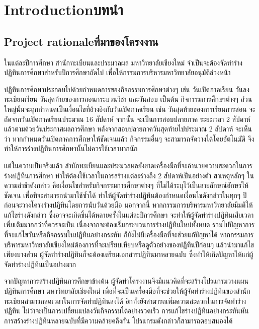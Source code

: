 \chapter{\ifenglish Introduction\else บทนำ\fi}

\section{\ifenglish Project rationale\else ที่มาของโครงงาน\fi}
ในแต่ละปีการศึกษา สำนักทะเบียนและประมวลผล มหาวิทยาลัยเชียงใหม่ จำเป็นจะต้องจัดทำร่างปฏิทินการศึกษาสำหรับปีการศึกษาถัดไป เพื่อให้กรรมการบริหารมหาวิทยาลัยอนุมัติล่วงหน้า

ปฏิทินการศึกษาประกอบไปด้วยกำหนดการของกิจกรรมการศึกษาต่างๆ เช่น วันเปิดภาคเรียน วันลงทะเบียนเรียน วันสุดท้ายของการถอนกระบวนวิชา และวันสอบ เป็นต้น
%
กิจกรรมการศึกษาต่างๆ ส่วนใหญ่นั้นจะถูกกำหนดเป็นเงื่อนไขที่อ้างอิงกับวันเปิดภาคเรียน เช่น วันสุดท้ายของการเรียนการสอน จะถัดจากวันเปิดภาคเรียนประมาณ 16 สัปดาห์ จากนั้น จะเป็นการสอบปลายภาค ระยะเวลา 2 สัปดาห์ แล้วตามด้วยวันประกาศผลการศึกษา หลังจากสอบปลายภาควันสุดท้ายไปประมาณ 2 สัปดาห์
%
จะเห็นว่า หากกำหนดวันเปิดภาคการศึกษาให้ชัดเจนแล้ว กิจกรรมอื่นๆ จะสามารถจัดวางได้โดยอัตโนมัติ จึงทำให้การร่างปฏิทินการศึกษานั้นไม่ควรใช้เวลามากนัก

แต่ในความเป็นจริงแล้ว สำนักทะเบียนและประมวลผลยังขาดเครื่องมือที่จะอำนวยความสะดวกในการร่างปฏิทินการศึกษา ทำให้ต้องใช้เวลาในการสร้างแต่ละร่างถึง 2 สัปดาห์เป็นอย่างต่ำ
%
สาเหตุหลักๆ ในความล่าช้าดังกล่าว คือเงื่อนไขสำหรับกิจกรรมการศึกษาต่างๆ ที่ไม่ได้ระบุไว้เป็นลายลักษณ์อักษรให้ชัดเจน เพื่อที่จะสามารถนำมาใช้ซ้ำได้ ทำให้ผู้จัดทำร่างปฏิทินต้องกำหนดเงื่อนไขดังกล่าวในทุกๆ ปี ก่อนจะวางโครงร่างปฏิทินโดยการนับวันด้วยมือ
%
นอกจากนี้ หากกรรมการบริหารมหาวิทยาลัยมีมติให้แก้ไขร่างดังกล่าว ซึ่งอาจจะเกิดขึ้นได้หลายครั้งในแต่ละปีการศึกษา จะทำให้ผู้จัดทำร่างปฏิทินเสียเวลาเพิ่มเติมมากกว่าที่ควรจะเป็น เนื่องจากจะต้องเริ่มกระบวนการร่างปฏิทินใหม่ทั้งหมด
%
รวมไปปัญหาการที่จะแก้ไขวันหรือกิจกรรมในปฏิทินอย่างกระทัน ก็ยังไม่มีเครื่องมือที่จะช่วยแก้ปัญหาได้ หากกรรมการบริหารมหาวิทยาลัยเชียงใหม่ต้องการที่จะเปรียบเทียบหรือดูตัวอย่างของปฏิทินปีก่อนๆ แล้วนำมาแก้ไขเพียงบางส่วน ผู้จัดทำร่างปฏิทินก็จะต้องเตรียมเอกสารปฏิทินมาหลายฉบับ ซึ่งทำให้เกิดปัญหาให้แก่ผู้จัดทำร่างปฏิทินเป็นอย่างมาก

จากปัญหาการสร้างปฏิทินการศึกษาข้างต้น ผู้จัดทำโครงงานจึงมีแนวคิดที่จะสร้างโปรแกรมวางแผนปฏิทินการศึกษา มหาวิทยาลัยเชียงใหม่
%
เพื่อที่จะเป็นเครื่องมือที่จะช่วยให้ผู้จัดทำร่างปฏิทินของสำนักทะเบียนสามารถลดเวลาในการจัดทำปฏิทินลงได้
%
อีกทั้งยังสามารถเพิ่มความสะดวกในการจัดทำร่างปฏิทิน ไม่ว่าจะเป็นการเปลี่ยนแปลงวันกิจกรรมได้อย่างรวดเร็ว การแก้ไขร่างปฏิทินอย่างกระทันหัน การสร้างร่างปฏิทินหลายฉบับที่มีความคล้ายคลึงกัน โปรแกรมดังกล่าวก็สามารถตอบสนองได้

